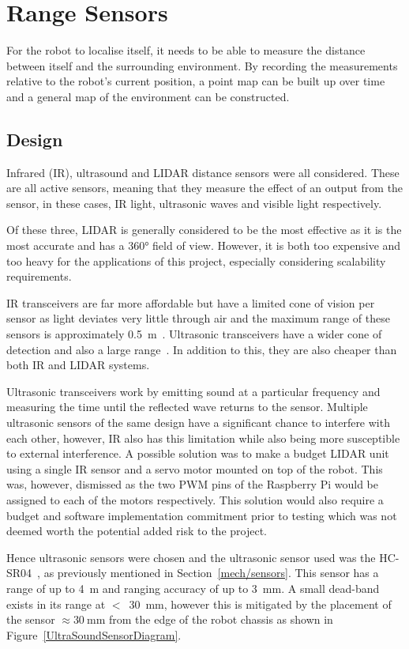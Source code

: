 \section{Range Sensors}\label{elec/range}
For the robot to localise itself, it needs to be able to measure the
distance between itself and the surrounding environment. By recording
the measurements relative to the robot's current position, a point map
can be built up over time and a general map of the environment can be
constructed.

\subsection{Design}\label{elec/range/design}
Infrared (IR), ultrasound and LIDAR distance sensors were all considered. These
are all active sensors, meaning that they measure the effect of an
output from the sensor, in these cases, IR light, ultrasonic waves
and visible light respectively.

Of these three, LIDAR is generally considered to be the most effective
as it is the most accurate and has a \ang{360} field of view. However,
it is both too expensive and too heavy for the applications of this project, especially
considering scalability requirements.

IR transceivers are far more affordable but have a limited cone of
vision per sensor as light deviates very little through air and the
maximum range of these sensors is approximately \SI{0.5}{\m}~\cite{InfraredDatasheet}.
Ultrasonic transceivers have a wider cone of
detection and also a large range~\cite{HCSR04datasheet}. In addition to
this, they are also cheaper than both IR and LIDAR systems.

Ultrasonic transceivers work by emitting sound at a particular frequency
and measuring the time until the reflected wave returns to the sensor.
Multiple ultrasonic sensors of the same design have a significant chance to interfere with each other,
however, IR also has this limitation
while also being more susceptible to external interference. A possible solution
was to make a budget LIDAR unit using a single IR sensor and a
servo motor mounted on top of the robot. This was, however, dismissed as
the two PWM pins of the Raspberry Pi would be assigned to each of the
motors respectively. This solution would also require a budget and
software implementation commitment prior to testing which was not deemed
worth the potential added risk to the project.

Hence ultrasonic sensors were chosen and the ultrasonic sensor used was
the HC-SR04~\cite{HCSR04datasheet}, as previously mentioned in Section~\ref{mech/sensors}. This sensor has a range of up to \SI{4}{\m} and
ranging accuracy of up to \SI{3}{\mm}. A small dead-band exists in its
range at $<$~\SI{30}{\mm}, however this is mitigated by the placement of
the sensor $\approx{\SI{30}{\mm}}$ from the edge of the robot chassis as shown in Figure~\ref{UltraSoundSensorDiagram}.

